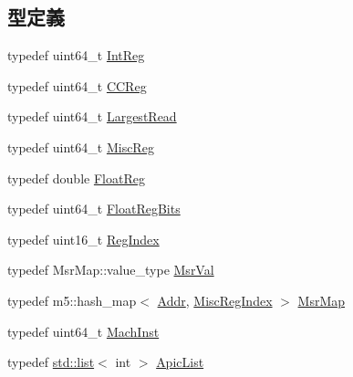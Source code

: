 \subsection*{型定義}
\begin{DoxyCompactItemize}
\item 
typedef uint64\_\-t \hyperlink{namespaceX86ISA_a0e080577527fb3e9685399f75b5caf15}{IntReg}
\item 
typedef uint64\_\-t \hyperlink{namespaceX86ISA_aaefa29979e267ea80ed6b82756284354}{CCReg}
\item 
typedef uint64\_\-t \hyperlink{namespaceX86ISA_a13e8c318dd29afdaf79751a072344db8}{LargestRead}
\item 
typedef uint64\_\-t \hyperlink{namespaceX86ISA_aa16539aa6584fd12f7d6fa868f75b4de}{MiscReg}
\item 
typedef double \hyperlink{namespaceX86ISA_a06fae4f187c7c94b8b0046dd6802be48}{FloatReg}
\item 
typedef uint64\_\-t \hyperlink{namespaceX86ISA_a6905e424d12491fe126e1a22a9c8d655}{FloatRegBits}
\item 
typedef uint16\_\-t \hyperlink{namespaceX86ISA_a69329e1d929a534ff51be6cf8216b69a}{RegIndex}
\item 
typedef MsrMap::value\_\-type \hyperlink{namespaceX86ISA_a6f30fa1d82bdac857c02f93c6cd605d5}{MsrVal}
\item 
typedef m5::hash\_\-map$<$ \hyperlink{base_2types_8hh_af1bb03d6a4ee096394a6749f0a169232}{Addr}, \hyperlink{namespaceX86ISA_a1e522017e015d4c7efd6b2360143aa67}{MiscRegIndex} $>$ \hyperlink{namespaceX86ISA_afe7406830ac3c2d1d425e6b2f8985b0e}{MsrMap}
\item 
typedef uint64\_\-t \hyperlink{namespaceX86ISA_a7ceadb544bf9b4a10579b7466b0ac008}{MachInst}
\item 
typedef \hyperlink{classstd_1_1list}{std::list}$<$ int $>$ \hyperlink{namespaceX86ISA_a25e7a37aec0875a2333d311783729d23}{ApicList}
\end{DoxyCompactItemize}
